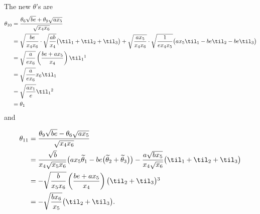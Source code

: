 {$\!\!$The new $\theta$'s are
\begin{align*}
\theta_{10}&=\frac{\theta_6\sqrt{be}+\theta_9\sqrt{ax_5}}{\sqrt{x_4x_6}}\\
&=\sqrt{be\over x_4x_6}\cdot\sqrt{ab\over x_4}\big(\til_1+\til_2+\til_3\big)+\sqrt{ax_5\over x_4x_6}\cdot\sqrt{1\over{ex_4x_5}}\big(ax_5\til_1-be\til_2-be\til_3\big)\\
&=\sqrt{a\over ex_6}\left(be+ax_5\over x_4\right)\til_1\footnotemark
\\
&=\sqrt{a\over ex_6}x_6\til_1\\
&=\sqrt{ax_1\over e}\til_1\footnotemark\\
&=\theta_1
\end{align*}
and
\addtocounter{footnote}{-1}
\addtocounter{footnote}{+1}
\begin{align*}
\theta_{11}&=\frac{\theta_9\sqrt{be}-\theta_6\sqrt{ax_5}}{\sqrt{x_4x_6}}\\
&={\sqrt{b}\over x_4\sqrt{x_5x_6}}\big( a x_5 \widetilde{\theta}_1 - be \big(\widetilde{\theta}_2 + \widetilde{\theta}_3\big) \big)-{a\sqrt{bx_5}\over x_4\sqrt{x_6}}\big(\til_1+\til_2+\til_3\big)\\
&=-\sqrt{b\over x_5x_6}\left(be+ax_5\over x_4\right)\big(\til_2+\til_3\big)\footnotemark\\
&=-\sqrt{b x_6\over x_5}\big(\til_2+\til_3\big).
\end{align*}

}
